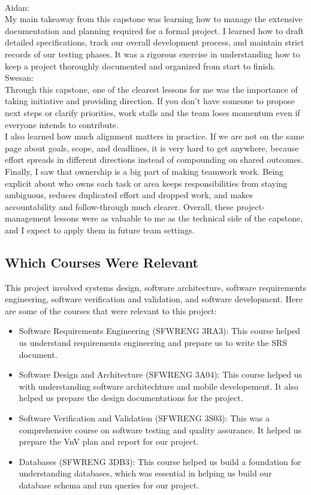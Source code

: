 \documentclass{article}
\begin{document}
\\
Aidan: \\
My main takeaway from this capstone was learning how to manage the extensive documentation and planning required for a formal project.
I learned how to draft detailed specifications, track our overall development process, and maintain strict records of our testing phases.
It was a rigorous exercise in understanding how to keep a project thoroughly documented and organized from start to finish.
\\
Swesan: \\
Through this capstone, one of the clearest lessons for me was the importance of taking initiative and providing direction. If you don't have someone to propose next steps or clarify priorities, work stalls and the team loses momentum even if everyone intends to contribute. \\
I also learned how much alignment matters in practice. If we are not on the same page about goals, scope, and deadlines, it is very hard to get anywhere, because effort spreads in different directions instead of compounding on shared outcomes. \\
Finally, I saw that ownership is a big part of making teamwork work. Being explicit about who owns each task or area keeps responsibilities from staying ambiguous, reduces duplicated effort and dropped work, and makes accountability and follow-through much clearer. Overall, these project-management lessons were as valuable to me as the technical side of the capstone, and I expect to apply them in future team settings.
\\



\subsection{Which Courses Were Relevant}

This project involved systems design, software architecture, software requirements engineering, software verification and validation, and software development.
Here are some of the courses that were relevant to this project:
\begin{itemize}
    \item Software Requirements Engineering (SFWRENG 3RA3): This course helped us understand requirements engineering and prepare us to write the SRS document. 
    \item Software Design and Architecture (SFWRENG 3A04): This course helped us with understanding software architechture and mobile developement. It also helped us prepare the design documentations for the project. 
    \item Software Verification and Validation (SFWRENG 3S03): This was a comprehensive course on software testing and quality assurance. It helped us prepare the VnV plan and report for our project.
    \item Databases (SFWRENG 3DB3): This course helped us build a foundation for understanding databases, which was essential in helping us build our database schema and run queries for our project.
\end{itemize}
\end{document}
